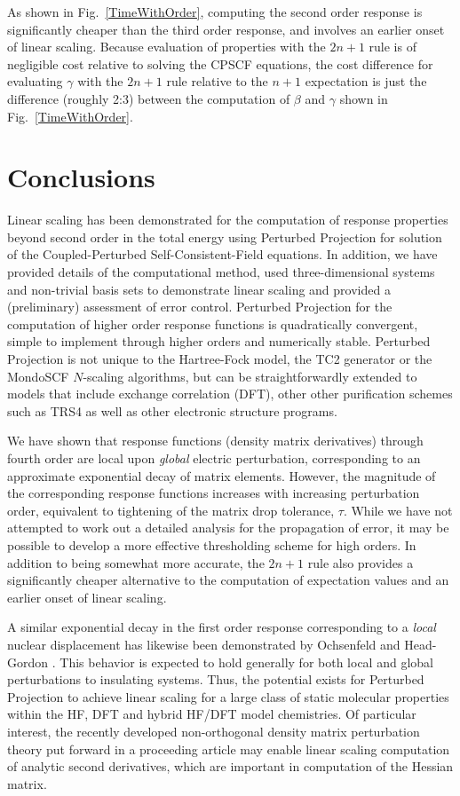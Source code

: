 \documentclass[prl,aps,preprint,showpacs,superbib]{revtex4}
\begin{document}
As shown in Fig.~\ref{TimeWithOrder}, computing the second order response is significantly cheaper 
than the third order response, and involves an earlier onset of linear scaling. Because evaluation 
of properties with the $2 n+1$ rule is of negligible cost relative to solving the CPSCF equations, the cost 
difference for evaluating $\gamma$ with the $2 n+1$ rule relative to the $n+1$ expectation is just the 
difference (roughly 2:3) between the computation of $\beta$ and $\gamma$ shown in Fig.~\ref{TimeWithOrder}.  

\section{Conclusions}

Linear scaling has been demonstrated for the computation of response properties beyond second
order in the total energy using Perturbed Projection for solution of the Coupled-Perturbed Self-Consistent-Field 
equations.
In addition, we have provided details of 
the computational method, used three-dimensional systems and non-trivial basis sets
to demonstrate linear scaling and provided a (preliminary) assessment of 
error control.  Perturbed Projection for the 
computation of higher order response functions is quadratically convergent, simple 
to implement through higher orders and numerically stable.  Perturbed Projection is 
not unique to the Hartree-Fock model, the TC2 generator or the {\sc MondoSCF} 
$N$-scaling algorithms, but can be straightforwardly extended to models that include 
exchange correlation (DFT), other other purification schemes such as TRS4 \cite{ANiklasson03}
as well as other electronic structure programs.  

We have shown that response functions (density matrix derivatives) through fourth 
order are local upon {\em global} electric perturbation, corresponding to an 
approximate exponential decay of matrix elements.  However, the magnitude of the 
corresponding response functions increases with increasing perturbation order, equivalent 
to tightening of the matrix drop tolerance, $\tau$.   While we have not attempted to 
work out a detailed analysis for the propagation of error, it may be possible 
to develop a more effective thresholding scheme for high orders. In addition 
to being somewhat more accurate, the $2 n+1$ rule also provides a significantly 
cheaper alternative to the computation of expectation values and an earlier onset 
of linear scaling. 

A similar exponential decay in the first order response corresponding to a {\em local} nuclear 
displacement has likewise been demonstrated by Ochsenfeld and Head-Gordon \cite{Ochsenfeld97}. 
This behavior is expected to hold generally for both local and global perturbations to 
insulating systems.  Thus, the potential exists for Perturbed Projection to achieve linear scaling
for a large class of static molecular properties within the HF, DFT and hybrid HF/DFT model 
chemistries. Of particular interest, the recently developed non-orthogonal density matrix perturbation 
theory put forward in a proceeding article \cite{ANiklasson05a} may enable linear scaling computation of analytic 
second derivatives, which are important in computation of the Hessian matrix.  
\end{document}
